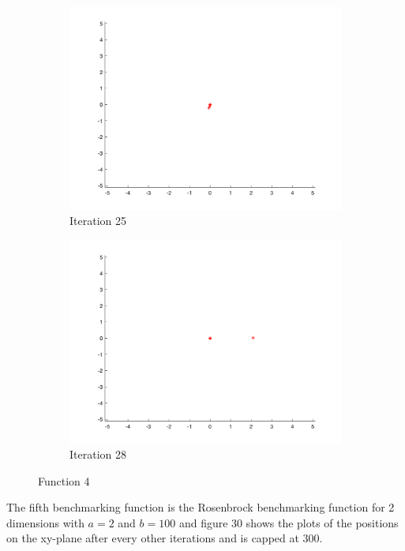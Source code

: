 \begin{figure}
\begin{subfigure}[b]{0.4\textwidth}
    \includegraphics[width=\textwidth]{img/smpl/rast2d/loa-iter-25}
    \caption{Iteration 25}
    \label{fig:s4-iter-6}
  \end{subfigure}
  \begin{subfigure}[b]{0.4\textwidth}
    \includegraphics[width=\textwidth]{img/smpl/rast2d/loa-iter-28}
    \caption{Iteration 28}
    \label{fig:s4-iter-7}
  \end{subfigure}
  \caption{Function 4}
\end{figure}


The fifth benchmarking function is the Rosenbrock benchmarking function for 2 dimensions with $a = 2$ and $b=100$ and figure 30 shows the plots of the positions on the xy-plane after every other iterations and is capped at 300.


